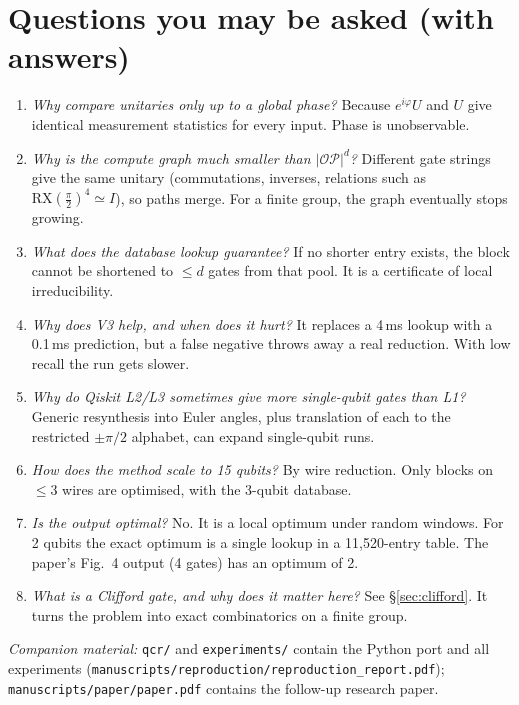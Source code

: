\documentclass[11pt,a4paper]{article}
\newcommand{\RX}{\mathrm{RX}}\newcommand{\RY}{\mathrm{RY}}\newcommand{\RZ}{\mathrm{RZ}}
\begin{document}
\section{Questions you may be asked (with answers)}
\begin{enumerate}[leftmargin=*]
\item \emph{Why compare unitaries only up to a global phase?} Because $e^{i\varphi}U$ and $U$ give identical measurement
  statistics for every input. Phase is unobservable.
\item \emph{Why is the compute graph much smaller than $|\mathcal{OP}|^d$?} Different gate strings give the same unitary
  (commutations, inverses, relations such as $\RX(\tfrac\pi2)^4\simeq I$), so paths merge.
  For a finite group, the graph eventually stops growing.
\item \emph{What does the database lookup guarantee?} If no shorter entry exists, the block cannot be shortened to $\le d$ gates from
  that pool. It is a certificate of local irreducibility.
\item \emph{Why does V3 help, and when does it hurt?} It replaces a 4\,ms lookup with a 0.1\,ms prediction, but a false negative throws
  away a real reduction. With low recall the run gets slower.
\item \emph{Why do Qiskit L2/L3 sometimes give more single-qubit gates than L1?} Generic resynthesis into Euler angles,
  plus translation of each to the restricted $\pm\pi/2$ alphabet, can expand single-qubit runs.
\item \emph{How does the method scale to 15 qubits?} By wire reduction. Only blocks on $\le3$ wires are optimised, with the 3-qubit database.
\item \emph{Is the output optimal?} No. It is a local optimum under random windows. For 2 qubits the exact optimum is a single lookup in a
  11,520-entry table. The paper's Fig.~4 output (4 gates) has an optimum of 2.
\item \emph{What is a Clifford gate, and why does it matter here?} See \S\ref{sec:clifford}. It turns the problem into exact
  combinatorics on a finite group.
\end{enumerate}

\vfill
{\small\textit{Companion material:} \texttt{qcr/} and \texttt{experiments/} contain the Python port and all experiments
(\texttt{manuscripts/reproduction/reproduction\_report.pdf}); \texttt{manuscripts/paper/paper.pdf} contains the follow-up research paper.}
\end{document}
